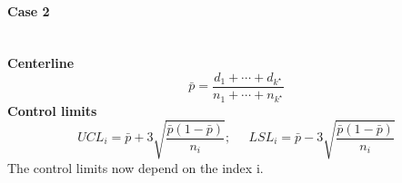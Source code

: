 \paragraph{Case 2}\mbox{}\\
\textbf{Centerline}
\begin{equation}
  \bar{p} = \frac{d_1 + \cdots + d_{k^\star}}{n_1 + \cdots + n_{k^\star}}
\end{equation}
\textbf{Control limits}
\begin{equation}
  UCL_i = \bar{p} + 3\sqrt{\frac{\bar{p}(1-\bar{p})}{n_i}}; \;\;\;\;\; LSL_i = \bar{p} - 3\sqrt{\frac{\bar{p}(1-\bar{p})}{n_i}}
\end{equation}
The control limits now depend on the index i.
